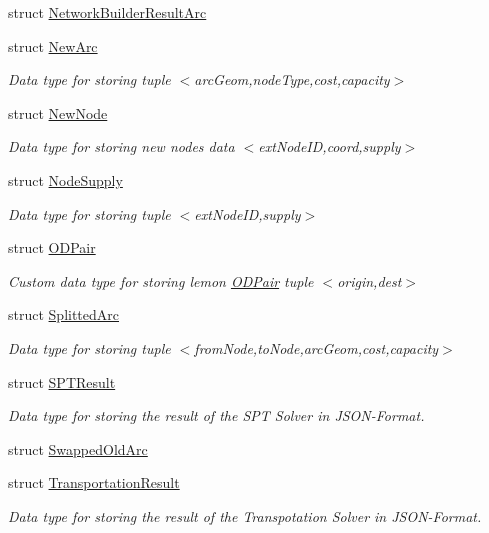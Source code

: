 \begin{DoxyCompactItemize}
\item 
struct \hyperlink{structnetxpert_1_1data_1_1NetworkBuilderResultArc}{Network\+Builder\+Result\+Arc}
\item 
struct \hyperlink{structnetxpert_1_1data_1_1NewArc}{New\+Arc}
\begin{DoxyCompactList}\small\item\em Data type for storing tuple $<$arc\+Geom,node\+Type,cost,capacity$>$ \end{DoxyCompactList}\item 
struct \hyperlink{structnetxpert_1_1data_1_1NewNode}{New\+Node}
\begin{DoxyCompactList}\small\item\em Data type for storing new nodes data $<$ext\+Node\+ID,coord,supply$>$ \end{DoxyCompactList}\item 
struct \hyperlink{structnetxpert_1_1data_1_1NodeSupply}{Node\+Supply}
\begin{DoxyCompactList}\small\item\em Data type for storing tuple $<$ext\+Node\+ID,supply$>$ \end{DoxyCompactList}\item 
struct \hyperlink{structnetxpert_1_1data_1_1ODPair}{O\+D\+Pair}
\begin{DoxyCompactList}\small\item\em Custom data type for storing lemon \hyperlink{structnetxpert_1_1data_1_1ODPair}{O\+D\+Pair} tuple $<$origin,dest$>$ \end{DoxyCompactList}\item 
struct \hyperlink{structnetxpert_1_1data_1_1SplittedArc}{Splitted\+Arc}
\begin{DoxyCompactList}\small\item\em Data type for storing tuple $<$from\+Node,to\+Node,arc\+Geom,cost,capacity$>$ \end{DoxyCompactList}\item 
struct \hyperlink{structnetxpert_1_1data_1_1SPTResult}{S\+P\+T\+Result}
\begin{DoxyCompactList}\small\item\em Data type for storing the result of the S\+PT Solver in J\+S\+O\+N-\/\+Format. \end{DoxyCompactList}\item 
struct \hyperlink{structnetxpert_1_1data_1_1SwappedOldArc}{Swapped\+Old\+Arc}
\item 
struct \hyperlink{structnetxpert_1_1data_1_1TransportationResult}{Transportation\+Result}
\begin{DoxyCompactList}\small\item\em Data type for storing the result of the Transpotation Solver in J\+S\+O\+N-\/\+Format. \end{DoxyCompactList}\end{DoxyCompactItemize}
